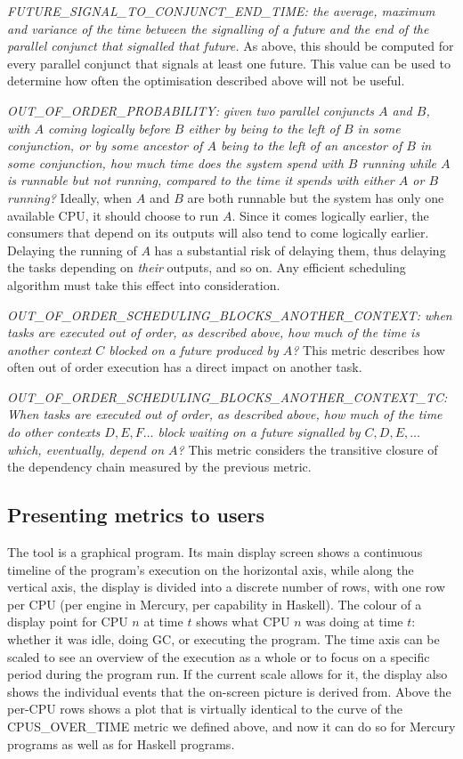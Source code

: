 \emph{FUTURE\_SIGNAL\_TO\_CONJUNCT\_END\_TIME:
the average, maximum and variance of the time
between the signalling of a future
and the end of the parallel conjunct that signalled that future.}
As above, this should be computed for
every parallel conjunct that signals at least one future.
This value can be used to determine
how often the optimisation described above will not be useful.

\emph{OUT\_OF\_ORDER\_PROBABILITY:
given two parallel conjuncts $A$ and $B$,
with $A$ coming logically before $B$
either by being to the left of $B$ in some conjunction,
or by some ancestor of $A$ being to the left of an ancestor of $B$
in some conjunction,
how much time does the system spend with $B$ running
while $A$ is runnable but not running,
compared to the time it spends with either $A$ or $B$ running?}
Ideally, when $A$ and $B$ are both runnable
but the system has only one available CPU,
it should choose to run $A$.
Since it comes logically earlier,
the consumers that depend on its outputs
will also tend to come logically earlier.
Delaying the running of $A$ has a substantial risk of delaying them,
thus delaying the tasks depending on \emph{their} outputs, and so on.
Any efficient scheduling algorithm
must take this effect into consideration.

\emph{OUT\_OF\_ORDER\_SCHEDULING\_BLOCKS\_ANOTHER\_CONTEXT:
when tasks are executed out of order, as described above,
how much of the time is another context $C$
blocked on a future produced by $A$?}
This metric describes how often
out of order execution has a direct impact on another task.

\emph{OUT\_OF\_ORDER\_SCHEDULING\_BLOCKS\_ANOTHER\_CONTEXT\_TC:
When tasks are executed out of order, as described above,
how much of the time do other contexts $D, E, F\ldots$ block
waiting on a future signalled by $C, D, E, \ldots$
which, eventually, depend on $A$?}
This metric considers the transitive closure of the dependency chain
measured by the previous metric.

\subsection{Presenting metrics to users}

The \tscope tool is a graphical program.
Its main display screen shows
a continuous timeline of the program's execution on the horizontal axis,
while along the vertical axis,
the display is divided into a discrete number of rows,
with one row per CPU (per engine in Mercury, per capability in Haskell).
The colour of a display point for CPU $n$ at time $t$
shows what CPU $n$ was doing at time $t$:
whether it was idle, doing GC, or executing the program.
The time axis can be scaled to see an overview of the execution as a whole
or to focus on a specific period during the program run.
If the current scale allows for it,
the display also shows the individual events
that the on-screen picture is derived from.
Above the per-CPU rows \tscope shows a plot that is virtually identical
to the curve of the CPUS\_OVER\_TIME metric we defined above,
and now it can do so for Mercury programs as well as for Haskell programs.

